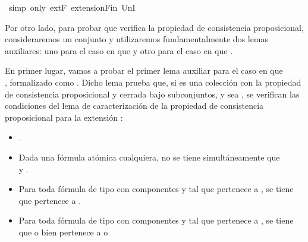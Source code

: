 \begin{isabellebody}
\ {\isacharparenleft}simp\ only{\isacharcolon}\ extF\ extensionFin\ UnI{}{\isacharparenright}\isanewline
\ \ \ \isamarkupfalse%
\isanewline
\ \isamarkupfalse%
\isanewline
{}\isamarkupfalse%
%
\endisatagproof
{\isafoldproof}%
%
\isadelimproof
%
\endisadelimproof
%
\begin{isamarkuptext}%
Por otro lado, para probar que    verifica la propiedad de consistencia 
  proposicional, consideraremos un conjunto  y utilizaremos fundamentalmente dos lemas 
  auxiliares: uno para el caso en que  y otro para el caso en que . 

  En primer lugar, vamos a probar el primer lema auxiliar para el caso en que\\ , formalizado
  como . Dicho lema prueba que, si  es una colección con la propiedad de 
  consistencia proposicional y cerrada bajo subconjuntos, y sea , se verifican
  las condiciones del lema de caracterización de la propiedad de consistencia proposicional para
  la extensión :
  \begin{itemize}
    \item {}.
    \item Dada  una fórmula atómica cualquiera, no se tiene 
    simultáneamente que\\  y .
    \item Para toda fórmula de tipo \isa{{\isasymalpha}} con componentes  y  tal que \isa{{\isasymalpha}}
    pertenece a , se tiene que  pertenece a .
    \item Para toda fórmula de tipo \isa{{\isasymbeta}} con componentes  y  tal que \isa{{\isasymbeta}}
    pertenece a , se tiene que o bien  pertenece a  o 

\end{itemize}
\end{isamarkuptext}
\end{isabellebody}
